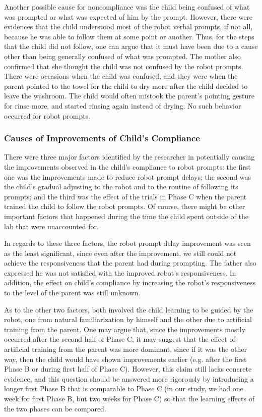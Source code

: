 Another possible cause for noncompliance was the child being confused of what was prompted or what was expected of him by the prompt.  However, there were evidences that the child understood most of the robot verbal prompts, if not all, because he was able to follow them at some point or another.  Thus, for the steps that the child did not follow, one can argue that it must have been due to a cause other than being generally confused of what was prompted.  The mother also confirmed that she thought the child was not confused by the robot prompts.  There were occasions when the child was confused, and they were when the parent pointed to the towel for the child to dry more after the child decided to leave the washroom.  The child would often mistook the parent's pointing gesture for rinse more, and started rinsing again instead of drying.  No such behavior occurred for robot prompts.


\subsubsection{Causes of Improvements of Child's Compliance}
There were three major factors identified by the researcher in potentially causing the improvements observed in the child's compliance to robot prompts: the first one was the improvements made to reduce robot prompt delays; the second was the child's gradual adjusting to the robot and to the routine of following its prompts; and the third was the effect of the trials in Phase C when the parent trained the child to follow the robot prompts.  Of course, there might be other important factors that happened during the time the child spent outside of the lab that were unaccounted for.

In regards to these three factors, the robot prompt delay improvement was seen as the least significant, since even after the improvement, we still could not achieve the responsiveness that the parent had during prompting.  The father also expressed he was not satisfied with the improved robot's responsiveness.   In addition, the effect on child's compliance by increasing the robot's responsiveness to the level of the parent was still unknown.

As to the other two factors, both involved the child learning to be guided by the robot, one from natural familiarization by himself and the other due to artificial training from the parent.  One may argue that, since the improvements mostly occurred after the second half of Phase C, it may suggest that the effect of artificial training from the parent was more dominant, since if it was the other way, then the child would have shown improvements earlier (e.g. after the first Phase B or during first half of Phase C).  However, this claim still lacks concrete evidence, and this question should be answered more rigorously by introducing a longer first Phase B that is comparable to Phase C (in our study, we had one week for first Phase B, but two weeks for Phase C) so that the learning effects of the two phases can be compared.


